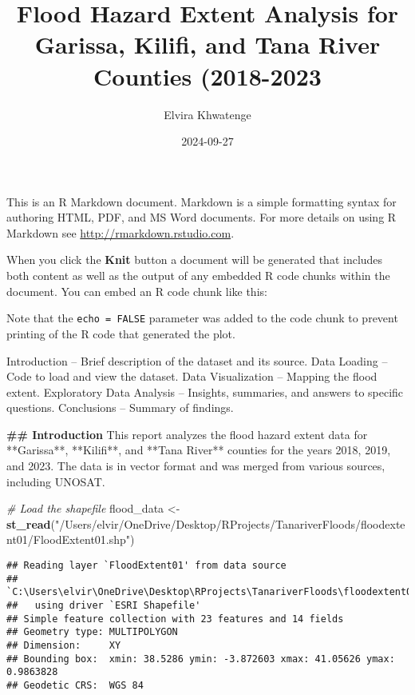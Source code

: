 \documentclass[
]{article}
\title{Flood Hazard Extent Analysis for Garissa, Kilifi, and Tana River
Counties (2018-2023}
\author{Elvira Khwatenge}
\date{2024-09-27}
\newenvironment{Shaded}{\begin{snugshade}}{\end{snugshade}}
\newcommand{\CommentTok}[1]{\textcolor[rgb]{0.56,0.35,0.01}{\textit{#1}}}
\newcommand{\FunctionTok}[1]{\textcolor[rgb]{0.13,0.29,0.53}{\textbf{#1}}}
\newcommand{\NormalTok}[1]{#1}
\newcommand{\OtherTok}[1]{\textcolor[rgb]{0.56,0.35,0.01}{#1}}
\newcommand{\StringTok}[1]{\textcolor[rgb]{0.31,0.60,0.02}{#1}}
\begin{document}
\maketitle

This is an R Markdown document. Markdown is a simple formatting syntax
for authoring HTML, PDF, and MS Word documents. For more details on
using R Markdown see \url{http://rmarkdown.rstudio.com}.

When you click the \textbf{Knit} button a document will be generated
that includes both content as well as the output of any embedded R code
chunks within the document. You can embed an R code chunk like this:

Note that the \texttt{echo\ =\ FALSE} parameter was added to the code
chunk to prevent printing of the R code that generated the plot.

Introduction -- Brief description of the dataset and its source. Data
Loading -- Code to load and view the dataset. Data Visualization --
Mapping the flood extent. Exploratory Data Analysis -- Insights,
summaries, and answers to specific questions. Conclusions -- Summary of
findings.

\begin{Shaded}
\begin{Highlighting}[]
\FunctionTok{\#\# Introduction}
\NormalTok{This report analyzes the flood hazard extent data for **Garissa**, **Kilifi**, and **Tana River** counties for the years 2018, 2019, and 2023. The data is in vector format and was merged from various sources, including UNOSAT.}
\end{Highlighting}
\end{Shaded}

\begin{Shaded}
\begin{Highlighting}[]
\CommentTok{\# Load the shapefile}
\NormalTok{flood\_data }\OtherTok{\textless{}{-}} \FunctionTok{st\_read}\NormalTok{(}\StringTok{"/Users/elvir/OneDrive/Desktop/RProjects/TanariverFloods/floodextent01/FloodExtent01.shp"}\NormalTok{)}
\end{Highlighting}
\end{Shaded}

\begin{verbatim}
## Reading layer `FloodExtent01' from data source 
##   `C:\Users\elvir\OneDrive\Desktop\RProjects\TanariverFloods\floodextent01\FloodExtent01.shp' 
##   using driver `ESRI Shapefile'
## Simple feature collection with 23 features and 14 fields
## Geometry type: MULTIPOLYGON
## Dimension:     XY
## Bounding box:  xmin: 38.5286 ymin: -3.872603 xmax: 41.05626 ymax: 0.9863828
## Geodetic CRS:  WGS 84
\end{verbatim}
\end{document}
